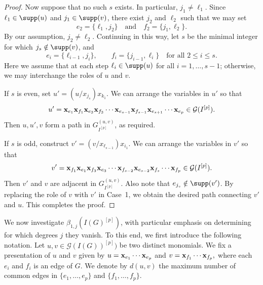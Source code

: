 \documentclass[12pt]{amsart}
\begin{document}
\begin{proof}
Now suppose that no such $s$ exists. 
In particular, $j_1 \ne \ell_1$. 
Since $\ell_1 \in \supp(u)$ and $j_1 \in \supp(v)$, there exist $j_2$ and $\ell_2$ such that we may set 
\[
e_2 = \{\ell_1, j_2\} \quad \text{and} \quad f_2 = \{j_1, \ell_2\}.
\]
By our assumption, $j_2 \ne \ell_2$. 
Continuing in this way, let $s$ be the minimal integer for which $j_s \notin \supp(v)$, and  
\[
e_i = \{\ell_{i-1}, j_i\}, \qquad f_i = \{j_{i-1}, \ell_i\} \quad \text{for all } 2 \le i \le s.
\]
Here we assume that at each step $\ell_i \in \supp(u)$ for all $i = 1, \ldots, s-1$; otherwise, we may interchange the roles of $u$ and $v$. 

If $s$ is even, set $u' = (u/x_{j_s})x_{k_1}$. 
We can arrange the variables in $u'$ so that 
\[
u' = {\bf x}_{e_1}{\bf x}_{f_1}{\bf x}_{e_3}{\bf x}_{f_3} \cdots {\bf x}_{e_{s-1}}{\bf x}_{f_{s-1}}
{\bf x}_{e_{s+1}} \cdots {\bf x}_{e_p} \in \mathcal{G}(I^{[p]}).
\]
Then $u, u', v$ form a path in $G_{I^{[p]}}^{(u,v)}$, as required. 

If $s$ is odd, construct $v' = (v/x_{\ell_{s-1}})x_{i_1}$. 
We can arrange the variables in $v'$ so that 
\[
v' = {\bf x}_{f_1}{\bf x}_{e_1}{\bf x}_{f_3}{\bf x}_{e_3} \cdots {\bf x}_{f_{s-2}}{\bf x}_{e_{s-2}}
{\bf x}_{f_s} \cdots {\bf x}_{f_p} \in \mathcal{G}(I^{[p]}).
\]
Then $v'$ and $v$ are adjacent in $G_{I^{[p]}}^{(u,v)}$. 
Also note that $e_{j_s} \notin \supp(v')$. By replacing the role of $v$ with $v'$ in Case~1, we obtain the desired path connecting $v'$ and $u$. 
This completes the proof.
\end{proof}



 We now investigate $\beta_{1,j}(I(G)^{[p]})$, with particular emphasis on determining for which degrees $j$ they vanish. To this end, we first introduce the following notation. Let $u,v \in \mathcal{G}(I(G))^{[p]})$ be two distinct monomials. We fix a presentation of $u$ and $v$ given by $
u = {\bf x}_{e_1} \cdots {\bf x}_{e_p}$ and $v = {\bf x}_{f_1} \cdots {\bf x}_{f_p},$
where each $e_i$ and $f_i$ is an edge of $G$. We denote by $d(u,v)$ the maximum number of common edges in $\{e_1, \ldots, e_p\}$ and $\{f_1, \ldots, f_p\}$.
  
\end{document}
